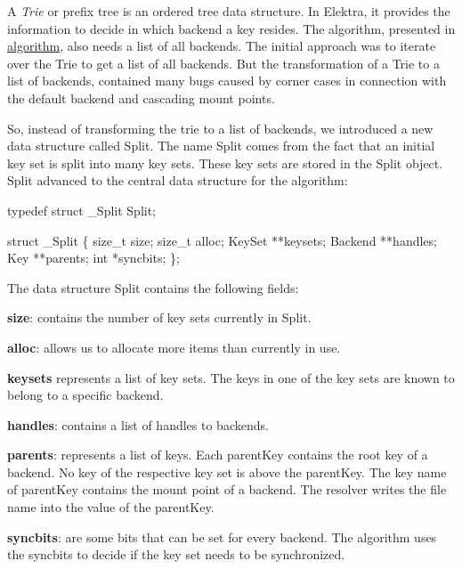 A {\itshape Trie} or prefix tree is an ordered tree data structure. In Elektra, it provides the information to decide in which backend a key resides. The algorithm, presented in \hyperlink{doc_dev_algorithm_md}{algorithm}, also needs a list of all backends. The initial approach was to iterate over the {\ttfamily Trie} to get a list of all backends. But the transformation of a {\ttfamily Trie} to a list of backends, contained many bugs caused by corner cases in connection with the default backend and cascading mount points.

So, instead of transforming the trie to a list of backends, we introduced a new data structure called {\ttfamily Split}. The name {\ttfamily Split} comes from the fact that an initial key set is split into many key sets. These key sets are stored in the {\ttfamily Split} object. {\ttfamily Split} advanced to the central data structure for the algorithm\+:


\begin{DoxyCode}
\textcolor{keyword}{typedef} \textcolor{keyword}{struct }\_Split   Split;

\textcolor{keyword}{struct }\_Split \{
        \textcolor{keywordtype}{size\_t} size;
        \textcolor{keywordtype}{size\_t} alloc;
        KeySet **keysets;
        Backend **handles;
        Key **parents;
        \textcolor{keywordtype}{int} *syncbits;
\};
\end{DoxyCode}


The data structure {\ttfamily Split} contains the following fields\+:


\begin{DoxyItemize}
\item {\bfseries size}\+: contains the number of key sets currently in {\ttfamily Split}.
\item {\bfseries alloc}\+: allows us to allocate more items than currently in use.
\item {\bfseries keysets} represents a list of key sets. The keys in one of the key sets are known to belong to a specific backend.
\item {\bfseries handles}\+: contains a list of handles to backends.
\item {\bfseries parents}\+: represents a list of keys. Each {\ttfamily parent\+Key} contains the root key of a backend. No key of the respective key set is above the {\ttfamily parent\+Key}. The key name of {\ttfamily parent\+Key} contains the mount point of a backend. The resolver writes the file name into the value of the {\ttfamily parent\+Key}.
\item {\bfseries syncbits}\+: are some bits that can be set for every backend. The algorithm uses the {\ttfamily syncbits} to decide if the key set needs to be synchronized.
\end{DoxyItemize}

